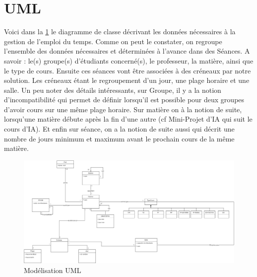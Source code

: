 \section{UML}

Voici dans la \ref{fig:uml} le diagramme de classe décrivant les données nécessaires à la gestion de l'emploi du temps.
Comme on peut le constater, on regroupe l'ensemble des données nécessaires et déterminées à l'avance dans des Séances. A savoir : le(s) groupe(s) d'étudiants concerné(s), le professeur, la matière, ainsi que le type de cours. Ensuite ces séances vont être associées à des créneaux par notre solution. Les créneaux étant le regroupement d'un jour, une plage horaire et une salle.
Un peu noter des détails intéressants, sur Groupe, il y a la notion d'incompatibilité qui permet de définir lorsqu'il est possible pour deux groupes d'avoir cours sur une même plage horaire. Sur matière on à la notion de suite, lorsqu'une matière débute après la fin d'une autre (cf Mini-Projet d'IA qui suit le cours d'IA). Et enfin sur séance, on a la notion de suite aussi qui décrit une nombre de jours minimum et maximum avant le prochain cours de la même matière.

\begin{landscape}

        \begin{figure}[t]
            \includegraphics[keepaspectratio=true,width=26cm]{diagrammeClasse.png}
            \caption{\label{fig:uml} Modélisation UML}
        \end{figure}

\end{landscape}
